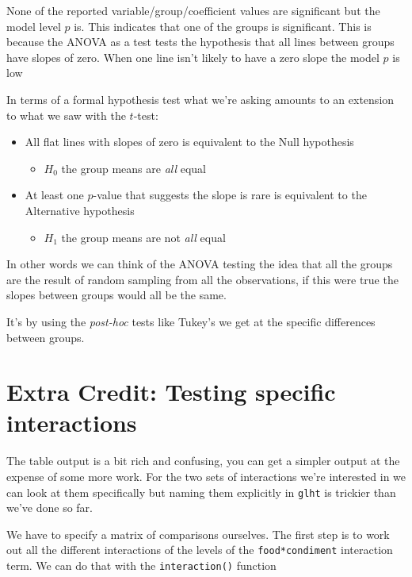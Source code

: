 \documentclass[
]{book}
\providecommand{\tightlist}{%
  \setlength{\itemsep}{0pt}\setlength{\parskip}{0pt}}
\begin{document}
None of the reported variable/group/coefficient values are significant but the model level \(p\) is. This indicates that one of the groups is significant. This is because the ANOVA as a test tests the hypothesis that all lines between groups have slopes of zero. When one line isn't likely to have a zero slope the model \(p\) is low

In terms of a formal hypothesis test what we're asking amounts to an extension to what we saw with the \(t\)-test:

\begin{itemize}
\tightlist
\item
  All flat lines with slopes of zero is equivalent to the Null hypothesis

  \begin{itemize}
  \tightlist
  \item
    \(H_{0}\) the group means are \emph{all} equal
  \end{itemize}
\item
  At least one \(p\)-value that suggests the slope is rare is equivalent to the Alternative hypothesis

  \begin{itemize}
  \tightlist
  \item
    \(H_{1}\) the group means are not \emph{all} equal
  \end{itemize}
\end{itemize}

In other words we can think of the ANOVA testing the idea that all the groups are the result of random sampling from all the observations, if this were true the slopes between groups would all be the same.

It's by using the \emph{post-hoc} tests like Tukey's we get at the specific differences between groups.

\hypertarget{extra-credit-testing-specific-interactions}{%
\section{Extra Credit: Testing specific interactions}\label{extra-credit-testing-specific-interactions}}

The table output is a bit rich and confusing, you can get a simpler output at the expense of some more work. For the two sets of interactions we're interested in we can look at them specifically but naming them explicitly in \texttt{glht} is trickier than we've done so far.

We have to specify a matrix of comparisons ourselves. The first step is to work out all the different interactions of the levels of the \texttt{food*condiment} interaction term. We can do that with the \texttt{interaction()} function
\end{document}
